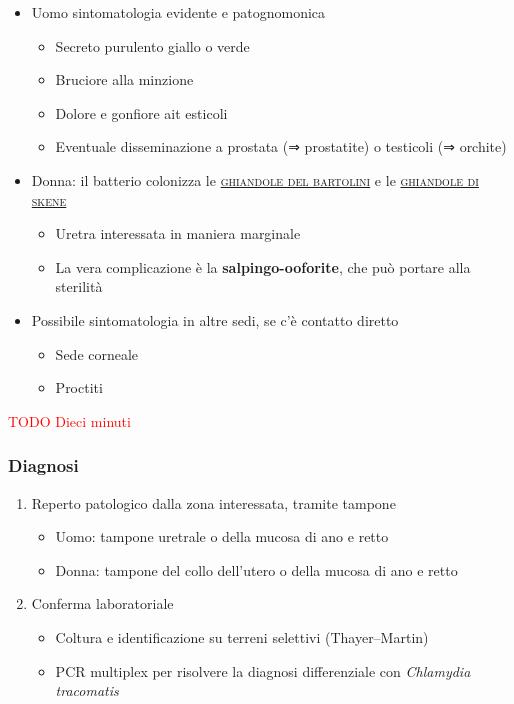 \documentclass[italian,]{article}
\providecommand{\tightlist}{%
  \setlength{\itemsep}{0pt}\setlength{\parskip}{0pt}}
\renewcommand{\a}[1]{\underline{\textsc{#1}}}
\newcommand{\TODO}[1]{\textcolor{red}{\textsf{\footnotesize{TODO #1}}}} %
\begin{document}
\begin{itemize}
\tightlist
\item
  Uomo sintomatologia evidente e patognomonica

  \begin{itemize}
  \tightlist
  \item
    Secreto purulento giallo o verde
  \item
    Bruciore alla minzione
  \item
    Dolore e gonfiore ait esticoli
  \item
    Eventuale disseminazione a prostata (⇒ prostatite) o testicoli (⇒
    orchite)
  \end{itemize}
\item
  Donna: il batterio colonizza le \a{ghiandole del bartolini} e le
  \a{ghiandole di skene}

  \begin{itemize}
  \tightlist
  \item
    Uretra interessata in maniera marginale
  \item
    La vera complicazione è la \textbf{salpingo-ooforite}, che può
    portare alla sterilità
  \end{itemize}
\item
  Possibile sintomatologia in altre sedi, se c'è contatto diretto

  \begin{itemize}
  \tightlist
  \item
    Sede corneale
  \item
    Proctiti
  \end{itemize}
\end{itemize}

\TODO{Dieci minuti}

\hypertarget{diagnosi-8}{%
\subsubsection{Diagnosi}\label{diagnosi-8}}

\begin{enumerate}
\def\labelenumi{\arabic{enumi}.}
\tightlist
\item
  Reperto patologico dalla zona interessata, tramite tampone

  \begin{itemize}
  \tightlist
  \item
    Uomo: tampone uretrale o della mucosa di ano e retto
  \item
    Donna: tampone del collo dell'utero o della mucosa di ano e retto
  \end{itemize}
\item
  Conferma laboratoriale

  \begin{itemize}
  \tightlist
  \item
    Coltura e identificazione su terreni selettivi (Thayer--Martin)
  \item
    PCR multiplex per risolvere la diagnosi differenziale con
    \emph{Chlamydia tracomatis}
  \end{itemize}
\end{enumerate}
\end{document}
